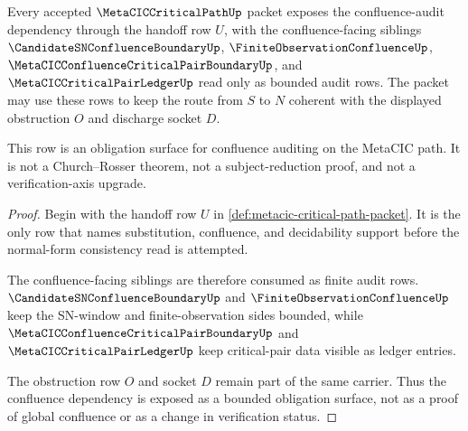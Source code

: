 \begin{theorem}
\label{thm:metacic-critical-path-confluence-audit-dependency-exposure}
Every accepted $\MetaCICCriticalPathUp$ packet exposes the confluence-audit dependency through the handoff row $U$, with the confluence-facing siblings $\CandidateSNConfluenceBoundaryUp$, $\FiniteObservationConfluenceUp$, $\MetaCICConfluenceCriticalPairBoundaryUp$, and $\MetaCICCriticalPairLedgerUp$ read only as bounded audit rows. The packet may use these rows to keep the route from $S$ to $N$ coherent with the displayed obstruction $O$ and discharge socket $D$.

This row is an obligation surface for confluence auditing on the MetaCIC path. It is not a Church--Rosser theorem, not a subject-reduction proof, and not a verification-axis upgrade.
\end{theorem}
\begin{proof}
Begin with the handoff row $U$ in \autoref{def:metacic-critical-path-packet}. It is the only row that names substitution, confluence, and decidability support before the normal-form consistency read is attempted.

The confluence-facing siblings are therefore consumed as finite audit rows. $\CandidateSNConfluenceBoundaryUp$ and $\FiniteObservationConfluenceUp$ keep the SN-window and finite-observation sides bounded, while $\MetaCICConfluenceCriticalPairBoundaryUp$ and $\MetaCICCriticalPairLedgerUp$ keep critical-pair data visible as ledger entries.

The obstruction row $O$ and socket $D$ remain part of the same carrier. Thus the confluence dependency is exposed as a bounded obligation surface, not as a proof of global confluence or as a change in verification status.
\end{proof}

